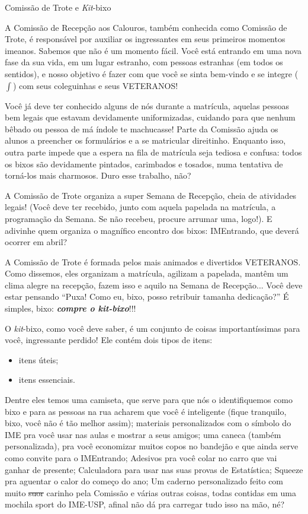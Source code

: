 \begin{secao}{Comissão de Trote e \textit{Kit}-bixo}

A Comissão de Recepção aos Calouros, também conhecida como Comissão de Trote,
é responsável por auxiliar os ingressantes em seus primeiros momentos imeanos.
Sabemos que não é um momento fácil. Você está entrando em uma nova fase da
sua vida, em um lugar estranho, com pessoas estranhas (em todos os sentidos), e
nosso objetivo é fazer com que você se sinta bem-vindo e se integre ($\int$)
com seus coleguinhas e seus VETERANOS!

Você já deve ter conhecido alguns de nós durante a matrícula, aquelas pessoas
bem legais que estavam devidamente uniformizadas, cuidando para que nenhum
bêbado ou pessoa de má índole te machucasse! Parte da Comissão ajuda os
alunos a preencher os formulários e a se matricular direitinho. Enquanto isso,
outra parte impede que a espera na fila de matrícula seja tediosa e confusa:
todos os bixos são devidamente pintados, carimbados e tosados, numa tentativa
de torná-los mais charmosos. Duro esse trabalho, não?

A Comissão de Trote organiza a super Semana de Recepção, cheia de atividades
legais! (Você deve ter recebido, junto com aquela papelada na matrícula, a
programação da Semana. Se não recebeu, procure arrumar uma, logo!).
E adivinhe quem organiza o magnífico encontro dos bixos: IMEntrando, que deverá
ocorrer em abril? %

A Comissão de Trote é formada pelos mais animados e divertidos VETERANOS. Como
dissemos, eles organizam a matrícula, agilizam a papelada, mantêm um clima
alegre na recepção, fazem isso e aquilo na Semana de Recepção...
Você deve estar pensando ``Puxa! Como eu, bixo, posso retribuir
tamanha dedicação?'' É simples, bixo: {\bf\em compre o \textit{kit}-bixo}!!!

O \textit{kit}-bixo, como você deve saber, é um conjunto de coisas importantíssimas
para você, ingressante perdido! Ele contém dois tipos de itens:
\begin{itemize}
\item itens úteis;
\item itens essenciais. 
\end{itemize}
Dentre eles temos uma camiseta, que serve para que
nós o identifiquemos como bixo e para as pessoas na rua acharem que você é
inteligente (fique tranquilo, bixo, você não é tão melhor assim);
 materiais personalizados com o símbolo do IME pra você usar nas aulas e mostrar a seus amigos;
 uma caneca (também personalizada), pra você economizar muitos copos no bandejão
e que ainda serve como convite para o IMEntrando;
 Adesivos pra você colar no carro que vai ganhar de presente;
 Calculadora para usar nas suas provas de Estatística;
 Squeeze pra aguentar o calor do começo do ano;
 Um caderno personalizado feito com muito \sout{suor} carinho pela Comissão e
 várias outras coisas, todas contidas em uma mochila sport do IME-USP, afinal
 não dá pra carregar tudo isso na mão, né?


\end{secao}
